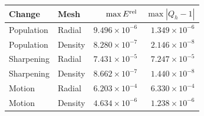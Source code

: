 \begin{tabular}{@{}llrr@{}}
\toprule
Change & Mesh & $\max E^{\rm rel}$ & $\max |Q_h-1|$\\
\midrule
Population & Radial & $9.496\times10^{-6}$ & $1.349\times10^{-6}$\\
Population & Density & $8.280\times10^{-7}$ & $2.146\times10^{-8}$\\
Sharpening & Radial & $7.431\times10^{-5}$ & $7.247\times10^{-5}$\\
Sharpening & Density & $8.662\times10^{-7}$ & $1.440\times10^{-8}$\\
Motion & Radial & $6.203\times10^{-4}$ & $6.330\times10^{-4}$\\
Motion & Density & $4.634\times10^{-6}$ & $1.238\times10^{-6}$\\
\bottomrule
\end{tabular}

